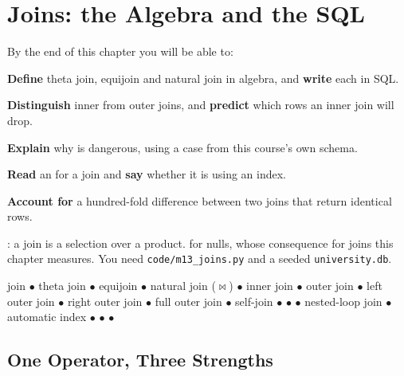\chapter{Joins: the Algebra and the SQL}\label{ch:joins}

\begin{outcomes}
By the end of this chapter you will be able to:
\begin{tight}
  \item \textbf{Define} theta join, equijoin and natural join in algebra, and
        \textbf{write} each in SQL.
  \item \textbf{Distinguish} inner from outer joins, and \textbf{predict}
        which rows an inner join will drop.
  \item \textbf{Explain} why  is dangerous, using a case
        from this course's own schema.
  \item \textbf{Read} an  for a join and
        \textbf{say} whether it is using an index.
  \item \textbf{Account for} a hundred-fold difference between two joins that
        return identical rows.
\end{tight}
\end{outcomes}

\begin{prereq}
: a join is a selection over a product.  for
nulls, whose consequence for joins this chapter measures. You need
\texttt{code/m13\_joins.py} and a seeded \texttt{university.db}.
\end{prereq}

\begin{keyterms}
join $\bullet$ theta join $\bullet$ equijoin $\bullet$ natural join ($\bowtie$)
$\bullet$ inner join $\bullet$ outer join $\bullet$ left outer join $\bullet$
right outer join $\bullet$ full outer join $\bullet$ self-join $\bullet$
 $\bullet$  $\bullet$ nested-loop join $\bullet$
automatic index $\bullet$  $\bullet$ 
$\bullet$ 
\end{keyterms}

\section{One Operator, Three Strengths}

